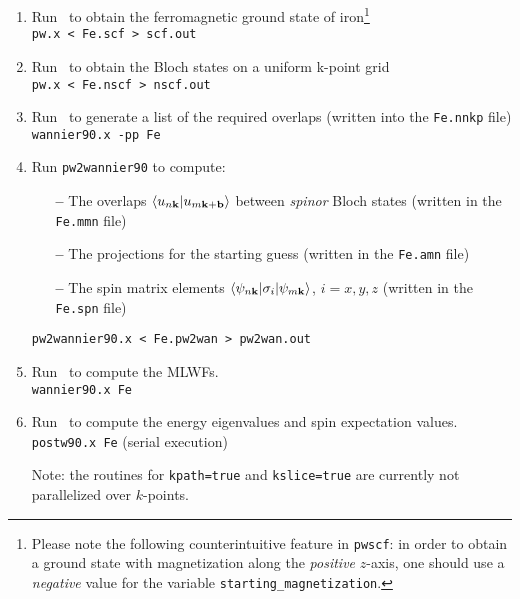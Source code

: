 \documentclass[a4paper,11pt,twoside]{article}
\begin{document}
\begin{enumerate}
\item Run \pwscf\ to obtain the ferromagnetic ground state of
  iron\footnote{Please note the following counterintuitive feature in
    {\tt pwscf}: in order to obtain a ground state with magnetization
    along the {\it positive} $z$-axis, one should use a {\it negative}
    value for the variable {\tt starting\_magnetization}.}\\
  {\tt pw.x < Fe.scf > scf.out}

\item Run \pwscf\ to obtain the Bloch states on a uniform k-point
  grid\\ 
{\tt pw.x < Fe.nscf > nscf.out}

\item Run \wannier\ to generate a list of the required overlaps (written
  into the {\tt Fe.nnkp} file)\\
{\tt wannier90.x -pp Fe}

\item Run {\tt pw2wannier90} to compute:
  \begin{itemize}

  \item[{\bf --}] The overlaps $\langle u_{n{\bf k}}\vert u_{m{\bf
        k}+{\bf b}}\rangle$ between {\it spinor} Bloch states (written
    in the {\tt Fe.mmn} file)

  \item[{\bf --}] The projections for the starting guess (written in
    the {\tt Fe.amn} file)

  \item[{\bf --}] The spin matrix elements $\langle \psi_{n{\bf
        k}}\vert \sigma_i\vert \psi_{m{\bf k}}\rangle$, $i=x,y,z$
    (written in the {\tt Fe.spn} file)
  \end{itemize}
{\tt pw2wannier90.x < Fe.pw2wan > pw2wan.out}

\item Run \wannier\ to compute the MLWFs.\\
{\tt wannier90.x Fe}

\item Run \postw\ to compute the energy eigenvalues and spin
  expectation values.\\
  {\tt postw90.x Fe} (serial execution) 

  Note: the routines for {\tt kpath=true} and {\tt kslice=true} are
  currently not parallelized over $k$-points.\\

\end{enumerate}
\end{document}
